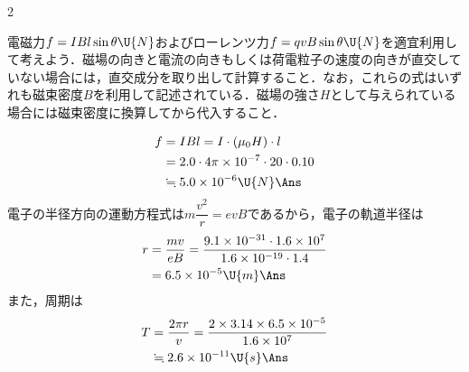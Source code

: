 \setlength{\columnseprule}{0.4pt}
\begin{multicols}{2}
\raggedcolumns

\par\nopagebreak
\begin{sisin}
電磁力$f=IBl\sin\theta\U{N}$およびローレンツ力$f=qvB\sin\theta\U{N}$を適宜利用して考えよう．磁場の向きと電流の向きもしくは荷電粒子の速度の向きが直交していない場合には，直交成分を取り出して計算すること．なお，これらの式はいずれも磁束密度$B$を利用して記述されている．磁場の強さ$H$として与えられている場合には磁束密度に換算してから代入すること．
\end{sisin}
\KaiHead
\begin{komon}
 \[\begin{aligned}
         f&=IBl=I\cdot(\mu_0H)\cdot l\\
          &=2.0\cdot 4\pi\times 10^{-7}\cdot 20\cdot 0.10\\
          &\fallingdotseq 5.0\times 10^{-6}\U{N}\Ans
       \end{aligned}\]
 電子の半径方向の運動方程式は$m\dfrac{v^2}{r}=evB$であるから，電子の軌道半径は
       \[\begin{aligned}
         r&=\frac{mv}{eB}=\frac{9.1\times 10^{-31}\cdot 1.6\times 10^7}{1.6\times 10^{-19}\cdot 1.4}\\
          &=6.5\times 10^{-5}\U{m}\Ans
       \end{aligned}\]
       また，周期は
       \[\begin{aligned}
         T&=\frac{2\pi r}{v}=\frac{2\times 3.14\times 6.5\times 10^{-5}}{1.6\times 10^7}\\
          &\fallingdotseq 2.6\times 10^{-11}\U{s}\Ans
       \end{aligned}\]
\end{komon}


\end{multicols}
